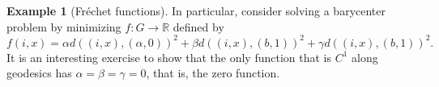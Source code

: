 \documentclass{article}
\theoremstyle{plain}\newtheorem{theorem}{Theorem}[section]
\theoremstyle{plain}\newtheorem{definition}[theorem]{Definition}
\theoremstyle{plain}\newtheorem{lemma}[theorem]{Lemma}
\theoremstyle{definition}\newtheorem{remark}[theorem]{Remark}
\theoremstyle{definition}\newtheorem{example}[theorem]{Example}
\theoremstyle{plain}\newtheorem{proposition}[theorem]{Proposition}
\theoremstyle{plain}\newtheorem{inference}[theorem]{Inference}
\theoremstyle{plain}\newtheorem{corollary}[theorem]{Corollary}
\theoremstyle{plain}\newtheorem{assumption}[theorem]{Assumption}
\newcommand{\bbR}{\mathbb{R}}
\begin{document}
\begin{example}[Fr\'echet functions]
  In particular, consider solving a barycenter problem
  by minimizing $f:G \to \bbR$ defined by
\begin{equation*}
  f(i, x) = \alpha d((i, x), (\alpha, 0))^2 + \beta d((i, x), (b, 1))^2 + \gamma d((i, x), (b, 1))^2.
\end{equation*}
It is an interesting exercise to show that the only function that is $C^1$ along geodesics
has $\alpha = \beta = \gamma = 0$, that is, the zero function.

\end{example}
\end{document}
